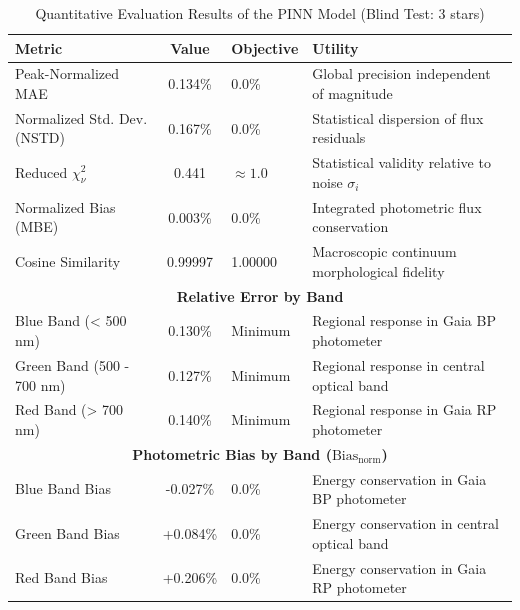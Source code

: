 
\begin{table}[htpb]
\centering
\caption{Quantitative Evaluation Results of the PINN Model (Blind Test: 3 stars)}
\label{tab:pinn_evaluation}
\begin{tabular}{lcll}
\hline
\textbf{Metric} & \textbf{Value} & \textbf{Objective} & \textbf{Utility} \\
\hline
Peak-Normalized MAE & 0.134\% & 0.0\% & Global precision independent of magnitude \\
Normalized Std. Dev. (NSTD) & 0.167\% & 0.0\% & Statistical dispersion of flux residuals \\
Reduced $\chi^2_\nu$ & 0.441 & $\approx 1.0$ & Statistical validity relative to noise $\sigma_i$ \\
Normalized Bias (MBE) & 0.003\% & 0.0\% & Integrated photometric flux conservation \\
Cosine Similarity & 0.99997 & 1.00000 & Macroscopic continuum morphological fidelity \\
\hline
\multicolumn{4}{c}{\textbf{Relative Error by Band}} \\
\hline
Blue Band (< 500 nm) & 0.130\% & Minimum & Regional response in Gaia BP photometer \\
Green Band (500 - 700 nm) & 0.127\% & Minimum & Regional response in central optical band \\
Red Band (> 700 nm) & 0.140\% & Minimum & Regional response in Gaia RP photometer \\
\hline
\multicolumn{4}{c}{\textbf{Photometric Bias by Band ($\text{Bias}_{\text{norm}}$)}} \\
\hline
Blue Band Bias & -0.027\% & 0.0\% & Energy conservation in Gaia BP photometer \\
Green Band Bias & +0.084\% & 0.0\% & Energy conservation in central optical band \\
Red Band Bias & +0.206\% & 0.0\% & Energy conservation in Gaia RP photometer \\
\hline
\end{tabular}
\end{table}
